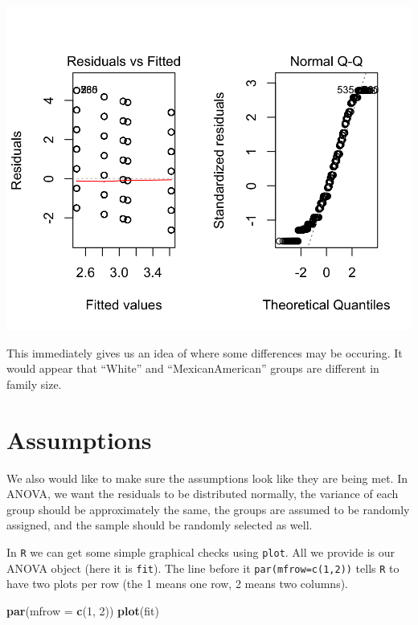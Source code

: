 \documentclass[]{tufte-book}
\newenvironment{Shaded}{}{}
\newcommand{\KeywordTok}[1]{\textcolor[rgb]{0.00,0.44,0.13}{\textbf{#1}}}
\newcommand{\DataTypeTok}[1]{\textcolor[rgb]{0.56,0.13,0.00}{#1}}
\newcommand{\DecValTok}[1]{\textcolor[rgb]{0.25,0.63,0.44}{#1}}
\newcommand{\NormalTok}[1]{#1}
\theoremstyle{definition}
\theoremstyle{definition}
\theoremstyle{remark}
\begin{document}
\includegraphics{_main_files/figure-latex/unnamed-chunk-68-1}

This immediately gives us an idea of where some differences may be
occuring. It would appear that ``White'' and ``MexicanAmerican'' groups
are different in family size.

\section*{Assumptions}\label{assumptions}

We also would like to make sure the assumptions look like they are being
met. In ANOVA, we want the residuals to be distributed normally, the
variance of each group should be approximately the same, the groups are
assumed to be randomly assigned, and the sample should be randomly
selected as well.

In \texttt{R} we can get some simple graphical checks using
\texttt{plot}. All we provide is our ANOVA object (here it is
\texttt{fit}). The line before it \texttt{par(mfrow=c(1,2))} tells
\texttt{R} to have two plots per row (the 1 means one row, 2 means two
columns).

\begin{Shaded}
\begin{Highlighting}[]
\KeywordTok{par}\NormalTok{(}\DataTypeTok{mfrow =} \KeywordTok{c}\NormalTok{(}\DecValTok{1}\NormalTok{, }\DecValTok{2}\NormalTok{))}
\KeywordTok{plot}\NormalTok{(fit)}
\end{Highlighting}
\end{Shaded}
\end{document}
